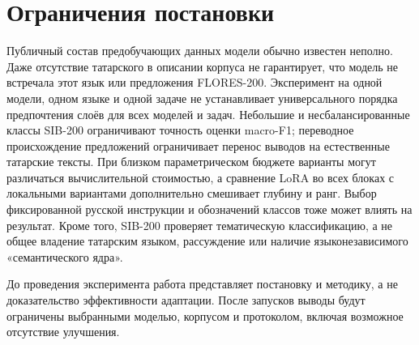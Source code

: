 \documentclass{misisarticle}
\begin{document}
\section{Ограничения постановки}

Публичный состав предобучающих данных модели обычно известен неполно. Даже отсутствие татарского в описании корпуса не гарантирует, что модель не встречала этот язык или предложения FLORES-200. Эксперимент на одной модели, одном языке и одной задаче не устанавливает универсального порядка предпочтения слоёв для всех моделей и задач. Небольшие и несбалансированные классы SIB-200 \cite[табл.~1]{adelani2023sib} ограничивают точность оценки macro-F1; переводное происхождение предложений ограничивает перенос выводов на естественные татарские тексты. При близком параметрическом бюджете варианты могут различаться вычислительной стоимостью, а сравнение LoRA во всех блоках с локальными вариантами дополнительно смешивает глубину и ранг. Выбор фиксированной русской инструкции и обозначений классов тоже может влиять на результат. Кроме того, SIB-200 проверяет тематическую классификацию, а не общее владение татарским языком, рассуждение или наличие языконезависимого «семантического ядра».

До проведения эксперимента работа представляет постановку и методику, а не доказательство эффективности адаптации. После запусков выводы будут ограничены выбранными моделью, корпусом и протоколом, включая возможное отсутствие улучшения.
\end{document}
